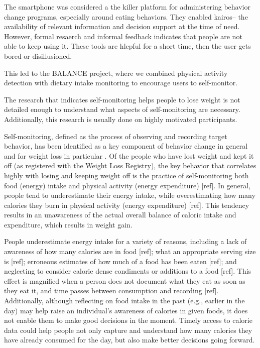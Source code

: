 The smartphone was considered a the killer platform for administering behavior change programs, especially around eating behaviors. They enabled kairos-- the availability of relevant information and decision support at the time of need. However, formal resaerch and informal feedback indicates that people are not able to keep using it. These tools are hlepful for a short time, then the user gets bored or disillusioned. 

This led to the BALANCE project, where we combined physical activity detection with dietary intake monitoring to  encourage users to self-monitor. 

The research that indicates self-monitoring helps people to lose weight is not detailed enough to understand what aspects of self-monitoring are necessary. Additionally, this research is usually done on highly motivated participants. 


Self-monitoring, defined as the process of observing and recording target behavior, has been identified as a key component of behavior change in general \citep{kanfer_self-monitoring:_1970} and for weight loss in particular \citep{michie_effective_2009} \citep{burke_effect_2011}. Of the people who have lost weight and kept it off (as registered with the Weight Loss Registry), the key behavior that correlates highly with losing and keeping weight off is the practice of self-monitoring both food (energy) intake and physical activity (energy expenditure) [ref]. In general, people tend to underestimate their energy intake, while overestimating how many calories they burn in physical activity (energy expenditure) [ref]. This tendency results in an unawareness of the actual overall balance of caloric intake and expenditure, which results in weight gain. 

People underestimate energy intake for a variety of reasons, including a lack of awareness of how many calories are in food [ref]; what an appropriate serving size is [ref]; erroneous estimates of how much of a food has been eaten [ref]; and neglecting to consider calorie dense condiments or additions to a food [ref]. This effect is magnified when a person does not document what they eat as soon as they eat it, and time passes between consumption and recording [ref]. Additionally, although reflecting on food intake in the past (e.g., earlier in the day) may help raise an individual's awareness of calories in given foods, it does not enable them to make good decisions in the moment. Timely access to calorie data could help people not only capture and understand how many calories they have already consumed for the day, but also make better decisions going forward. 

